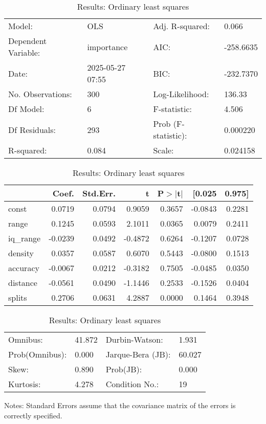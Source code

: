 \begin{table}
\caption{Results: Ordinary least squares}
\label{}
\begin{center}
\begin{tabular}{llll}
\hline
Model:              & OLS              & Adj. R-squared:     & 0.066      \\
Dependent Variable: & importance       & AIC:                & -258.6635  \\
Date:               & 2025-05-27 07:55 & BIC:                & -232.7370  \\
No. Observations:   & 300              & Log-Likelihood:     & 136.33     \\
Df Model:           & 6                & F-statistic:        & 4.506      \\
Df Residuals:       & 293              & Prob (F-statistic): & 0.000220   \\
R-squared:          & 0.084            & Scale:              & 0.024158   \\
\hline
\end{tabular}
\end{center}

\begin{center}
\begin{tabular}{lrrrrrr}
\hline
          &   Coef. & Std.Err. &       t & P$> |$t$|$ &  [0.025 & 0.975]  \\
\hline
const     &  0.0719 &   0.0794 &  0.9059 &      0.3657 & -0.0843 & 0.2281  \\
range     &  0.1245 &   0.0593 &  2.1011 &      0.0365 &  0.0079 & 0.2411  \\
iq\_range & -0.0239 &   0.0492 & -0.4872 &      0.6264 & -0.1207 & 0.0728  \\
density   &  0.0357 &   0.0587 &  0.6070 &      0.5443 & -0.0800 & 0.1513  \\
accuracy  & -0.0067 &   0.0212 & -0.3182 &      0.7505 & -0.0485 & 0.0350  \\
distance  & -0.0561 &   0.0490 & -1.1446 &      0.2533 & -0.1526 & 0.0404  \\
splits    &  0.2706 &   0.0631 &  4.2887 &      0.0000 &  0.1464 & 0.3948  \\
\hline
\end{tabular}
\end{center}

\begin{center}
\begin{tabular}{llll}
\hline
Omnibus:       & 41.872 & Durbin-Watson:    & 1.931   \\
Prob(Omnibus): & 0.000  & Jarque-Bera (JB): & 60.027  \\
Skew:          & 0.890  & Prob(JB):         & 0.000   \\
Kurtosis:      & 4.278  & Condition No.:    & 19      \\
\hline
\end{tabular}
\end{center}
\end{table}
\bigskip
Notes: \newline 
[1] Standard Errors assume that the covariance matrix of the errors is correctly specified.